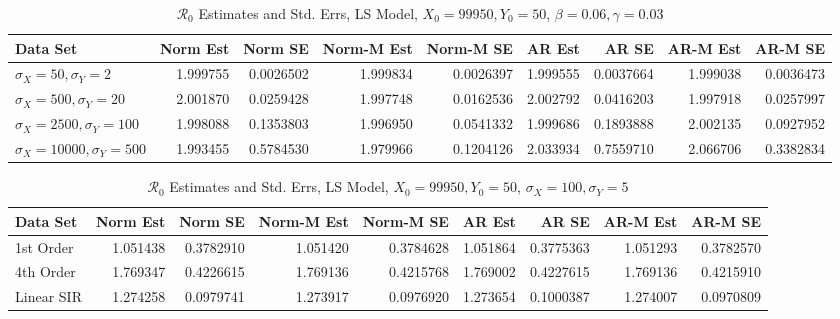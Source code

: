 \documentclass[12pt]{article}
\newcommand{\rr}{\ensuremath{\mathcal{R}_0}}
\begin{document}
\begin{table}[H]
	\caption{\label{tab:}$\rr$ Estimates and Std. Errs, LS Model,
		$X_0 = 99950, Y_0 = 50$, $\beta = 0.06, \gamma = 0.03$}
	\centering
	\begin{footnotesize}
		\begin{tabular}[t]{l|r|r|r|r|r|r|r|r}
			\hline
			Data Set & Norm Est & Norm SE & Norm-M Est & Norm-M SE & AR Est & AR SE & AR-M Est & AR-M SE\\
			\hline
			$\sigma_X = 50, \sigma_Y = 2$ & 1.999755 & 0.0026502 & 1.999834 & 0.0026397 & 1.999555 & 0.0037664 & 1.999038 & 0.0036473\\
			\hline
			$\sigma_X = 500, \sigma_Y = 20$ & 2.001870 & 0.0259428 & 1.997748 & 0.0162536 & 2.002792 & 0.0416203 & 1.997918 & 0.0257997\\
			\hline
			$\sigma_X = 2500, \sigma_Y = 100$ & 1.998088 & 0.1353803 & 1.996950 & 0.0541332 & 1.999686 & 0.1893888 & 2.002135 & 0.0927952\\
			\hline
			$\sigma_X = 10000, \sigma_Y = 500$ & 1.993455 & 0.5784530 & 1.979966 & 0.1204126 & 2.033934 & 0.7559710 & 2.066706 & 0.3382834\\
			\hline
		\end{tabular}
	\end{footnotesize}
\end{table}

\begin{table}[H]
	
	\caption{\label{tab:}$\rr$ Estimates and Std. Errs, LS Model,
		$X_0 = 99950, Y_0 = 50$, $\sigma_X = 100, \sigma_Y = 5$}
	\centering
	\begin{footnotesize}
		\begin{tabular}[t]{l|r|r|r|r|r|r|r|r}
			\hline
			Data Set & Norm Est & Norm SE & Norm-M Est & Norm-M SE & AR Est & AR SE & AR-M Est & AR-M SE\\
			\hline
			1st Order & 1.051438 & 0.3782910 & 1.051420 & 0.3784628 & 1.051864 & 0.3775363 & 1.051293 & 0.3782570\\
			\hline
			4th Order & 1.769347 & 0.4226615 & 1.769136 & 0.4215768 & 1.769002 & 0.4227615 & 1.769136 & 0.4215910\\
			\hline
			Linear SIR & 1.274258 & 0.0979741 & 1.273917 & 0.0976920 & 1.273654 & 0.1000387 & 1.274007 & 0.0970809\\
			\hline
		\end{tabular}
	\end{footnotesize}
\end{table}
\end{document}
